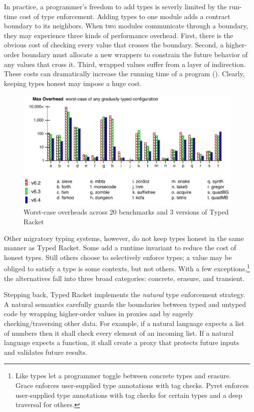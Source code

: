 In practice, a programmer's freedom to add types is severly limited by
 the run-time cost of type enforcement.
Adding types to one module adds a contract boundary to its neighbors.
When two modules communicate through a boundary, they may experience three kinds
 of performance overhead.
First, there is the obvious cost of checking every value that crosses the
 boundary.
Second, a higher-order boundary must allocate a new wrappers to constrain the
 future behavior of any values that cross it.
Third, wrapped values suffer from a layer of indirection.
These costs can dramatically increase the running time of a program
 ().
Clearly, keeping types honest may impose a huge cost.

\begin{figure}[h]
  \includegraphics[width=0.8\columnwidth]{src/jfp-2019-max.png}
  \caption{Worst-case overheads across 20 benchmarks and 3 versions of Typed Racket~\cite{gtnffvf-jfp-2019}}
  \label{fig:max-overhead}
\end{figure}

Other migratory typing systems, however, do not keep types honest in the
 same manner as Typed Racket.
Some add a runtime invariant to reduce the cost of honest types.
Still others choose to selectively enforce types; a value may be obliged to
 satisfy a type is some contexts, but not others.
With a few exceptions,\footnote{Like types
 let a programmer toggle between concrete types and erasure.
 Grace enforces user-supplied type annotations with tag checks.
 Pyret enforces user-supplied type annotations with tag checks
  for certain types and a deep traversal for others.}
 the alternatives fall into three broad categories:
 concrete, erasure, and transient.

Stepping back, Typed Racket implements the \emph{natural}\/ type enforcement
 strategy.
A natural semantics carefully guards the boundaries between typed and untyped
 code by wrapping higher-order values in proxies and by eagerly
 checking/traversing other data.
For example, if a natural language expects a list of numbers then it shall
 check every element of an incoming list.
If a natural language expects a function, it shall create a proxy that
 protects future inputs and validates future results.

